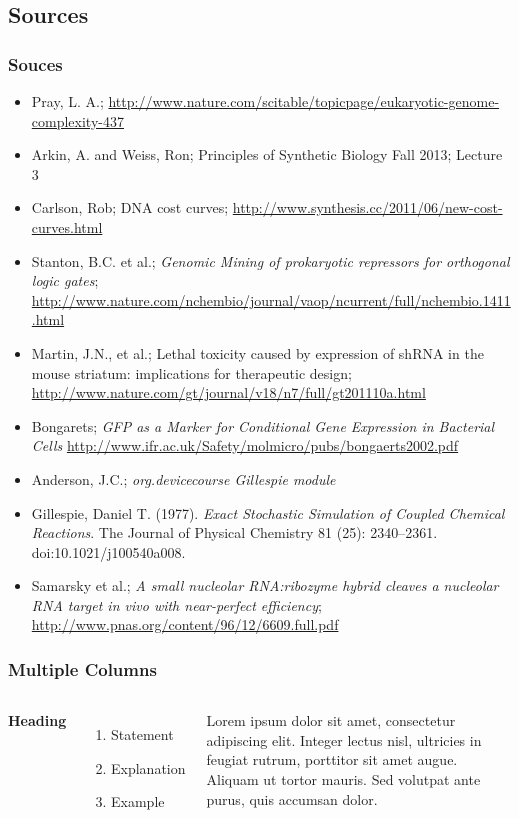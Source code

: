 \documentclass{beamer}
\begin{document}
\subsection{Sources}
\begin{frame}
\frametitle{Souces}

\begin{itemize}
\item Pray, L. A.; \url{http://www.nature.com/scitable/topicpage/eukaryotic-genome-complexity-437}
\item Arkin, A. and Weiss, Ron; Principles of Synthetic Biology Fall 2013; Lecture 3
\item Carlson, Rob; DNA cost curves; \url{http://www.synthesis.cc/2011/06/new-cost-curves.html}
\item Stanton, B.C. et al.; \emph{Genomic Mining of prokaryotic repressors for orthogonal logic gates};
  \url{http://www.nature.com/nchembio/journal/vaop/ncurrent/full/nchembio.1411.html}
\item Martin, J.N., et al.; Lethal toxicity caused by expression of shRNA in the mouse striatum: implications for therapeutic design;
  \url{http://www.nature.com/gt/journal/v18/n7/full/gt201110a.html}
\item Bongarets; \emph{GFP as a Marker for Conditional Gene Expression in Bacterial Cells}
  \url{http://www.ifr.ac.uk/Safety/molmicro/pubs/bongaerts2002.pdf}
\item Anderson, J.C.; \emph{org.devicecourse Gillespie module}
\item Gillespie, Daniel T. (1977). \emph{Exact Stochastic Simulation of Coupled Chemical Reactions}. The Journal of Physical Chemistry 81 (25): 2340–2361. doi:10.1021/j100540a008.
\item Samarsky et al.; \emph{A small nucleolar RNA:ribozyme hybrid cleaves a nucleolar RNA
target in vivo with near-perfect efficiency}; \url{http://www.pnas.org/content/96/12/6609.full.pdf}
\end{itemize}

\end{frame}

\begin{frame}
\frametitle{Multiple Columns}
\begin{columns}[c] %

\textbf{Heading}
\begin{enumerate}
\item Statement
\item Explanation
\item Example
\end{enumerate}

Lorem ipsum dolor sit amet, consectetur adipiscing elit. Integer lectus nisl, ultricies in feugiat rutrum, porttitor sit amet augue. Aliquam ut tortor mauris. Sed volutpat ante purus, quis accumsan dolor.

\end{columns}
\end{frame}
\end{document}
